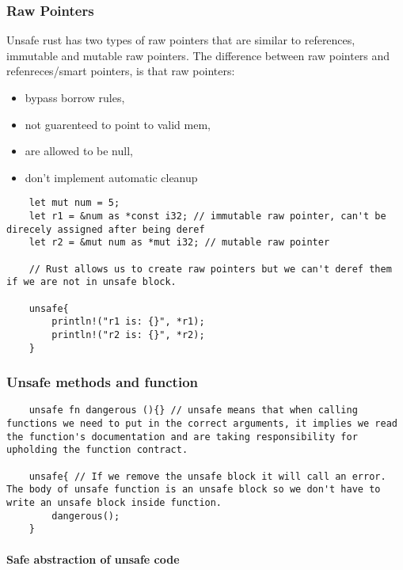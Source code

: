 \subsubsection{Raw Pointers}
Unsafe rust has two types of raw pointers that are similar to references, immutable and mutable raw pointers. The difference between raw pointers and refenreces/smart pointers, is that raw pointers:\begin{itemize}
    \item bypass borrow rules, 
    \item not guarenteed to point to valid mem, 
    \item are allowed to be null, 
    \item don't implement automatic cleanup
\end{itemize}
\begin{lstlisting}
    let mut num = 5;
    let r1 = &num as *const i32; // immutable raw pointer, can't be direcely assigned after being deref
    let r2 = &mut num as *mut i32; // mutable raw pointer

    // Rust allows us to create raw pointers but we can't deref them if we are not in unsafe block.

    unsafe{
        println!("r1 is: {}", *r1);
        println!("r2 is: {}", *r2);
    }
\end{lstlisting}

\subsubsection{Unsafe methods and function}

\begin{lstlisting}
    unsafe fn dangerous (){} // unsafe means that when calling functions we need to put in the correct arguments, it implies we read the function's documentation and are taking responsibility for upholding the function contract.

    unsafe{ // If we remove the unsafe block it will call an error. The body of unsafe function is an unsafe block so we don't have to write an unsafe block inside function.
        dangerous();
    }
\end{lstlisting}

\paragraph*{Safe abstraction of unsafe code}


